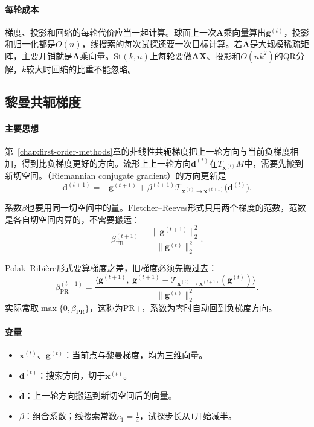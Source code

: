 \paragraph{每轮成本}
梯度、投影和回缩的每轮代价应当一起计算。球面上一次$\bm{A}$乘向量算出$\bm{g}^{(t)}$，投影和归一化都是$O(n)$，线搜索的每次试探还要一次目标计算。若$\bm{A}$是大规模稀疏矩阵，主要开销就是$\bm{A}$乘向量。$\mathrm{St}(k,n)$上每轮要做$\bm{A}\bm{X}$、投影和$O(nk^2)$的QR分解，$k$较大时回缩的比重不能忽略。

\subsection{黎曼共轭梯度}
\label{sec:mfo-rcg}

\paragraph{主要思想}
第~\ref{chap:first-order-methods}章的非线性共轭梯度把上一轮方向与当前负梯度相加，得到比负梯度更好的方向。流形上上一轮方向$\bm{d}^{(t)}$在$T_{\bm{x}^{(t)}}M$中，需要先搬到新切空间。（Riemannian conjugate gradient）的方向更新是
\begin{equation}
 \bm{d}^{(t+1)}=-\bm{g}^{(t+1)}+\beta^{(t+1)}\mathcal{T}_{\bm{x}^{(t)}\to\bm{x}^{(t+1)}}\bigl(\bm{d}^{(t)}\bigr).
 \label{eq:mfo-rcg-direction}
\end{equation}

系数$\beta$也要用同一切空间中的量。Fletcher--Reeves形式只用两个梯度的范数，范数是各自切空间内算的，不需要搬运：
\begin{equation}
 \beta_{\mathrm{FR}}^{(t+1)}=\frac{\lVert\bm{g}^{(t+1)}\rVert_2^2}{\lVert\bm{g}^{(t)}\rVert_2^2}.
 \label{eq:mfo-beta-fr}
\end{equation}

Polak--Ribière形式要算梯度之差，旧梯度必须先搬过去：
\begin{equation}
 \beta_{\mathrm{PR}}^{(t+1)}=\frac{\bigl\langle\bm{g}^{(t+1)},\ \bm{g}^{(t+1)}-\mathcal{T}_{\bm{x}^{(t)}\to\bm{x}^{(t+1)}}(\bm{g}^{(t)})\bigr\rangle}{\lVert\bm{g}^{(t)}\rVert_2^2}.
 \label{eq:mfo-beta-pr}
\end{equation}
实际常取$\max\{0,\beta_{\mathrm{PR}}\}$，这称为PR+，系数为零时自动回到负梯度方向。

\paragraph{变量}
\begin{itemize}
 \item $\bm{x}^{(t)}$、$\bm{g}^{(t)}$：当前点与黎曼梯度，均为三维向量。
 \item $\bm{d}^{(t)}$：搜索方向，切于$\bm{x}^{(t)}$。
 \item $\widetilde{\bm{d}}$：上一轮方向搬运到新切空间后的向量。
 \item $\beta$：组合系数；线搜索常数$c_1=\tfrac14$，试探步长从$1$开始减半。
\end{itemize}

